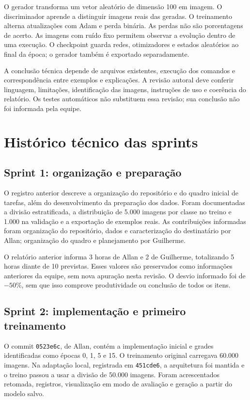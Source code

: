 \documentclass[12pt,a4paper]{article}
\begin{document}
O gerador transforma um vetor aleatório de dimensão 100 em imagem. O discriminador aprende a distinguir imagens reais das geradas. O treinamento alterna atualizações com Adam e perda binária. As perdas não são porcentagens de acerto. As imagens com ruído fixo permitem observar a evolução dentro de uma execução. O checkpoint guarda redes, otimizadores e estados aleatórios ao final da época; o gerador também é exportado separadamente.

A conclusão técnica depende de arquivos existentes, execução dos comandos e correspondência entre exemplos e explicações. A revisão autoral deve conferir linguagem, limitações, identificação das imagens, instruções de uso e coerência do relatório. Os testes automáticos não substituem essa revisão; sua conclusão não foi informada pela equipe.

\section{Histórico técnico das sprints}
\subsection{Sprint 1: organização e preparação}
O registro anterior descreve a organização do repositório e do quadro inicial de tarefas, além do desenvolvimento da preparação dos dados. Foram documentadas a divisão estratificada, a distribuição de 5.000 imagens por classe no treino e 1.000 na validação e a exportação de exemplos reais. As contribuições informadas foram organização do repositório, dados e caracterização do destinatário por Allan; organização do quadro e planejamento por Guilherme.

O relatório anterior informa 3 horas de Allan e 2 de Guilherme, totalizando 5 horas diante de 10 previstas. Esses valores são preservados como informações anteriores da equipe, sem nova apuração nesta revisão. O desvio informado foi de $-50\%$, sem que isso comprove produtividade ou conclusão de todos os itens.

\subsection{Sprint 2: implementação e primeiro treinamento}
O commit \texttt{0523e6c}, de Allan, contém a implementação inicial e grades identificadas como épocas 0, 1, 5 e 15. O treinamento original carregava 60.000 imagens. Na adaptação local, registrada em \texttt{451cde6}, a arquitetura foi mantida e o treino passou a usar a divisão de 50.000 imagens. Foram acrescentados retomada, registros, visualização em modo de avaliação e geração a partir do modelo salvo.
\end{document}
